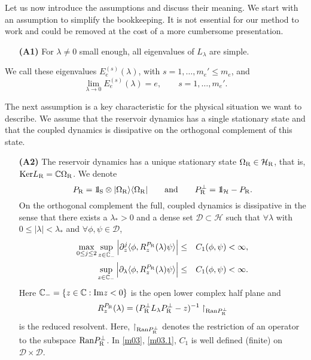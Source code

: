 \documentclass[letterpaper,onecolumn,11pt,accepted=2021-12-09]{quantumarticle}
\numberwithin{equation}{section}
\renewcommand{\r}{{\rm R}}
\newcommand{\s}{{\rm S}}
\newcommand{\bbbone}{\mathchoice {\rm 1\mskip-4mu l} {\rm 1\mskip-4mu l}
	{\rm 1\mskip-4.5mu l} {\rm 1\mskip-5mu l}}
\begin{document}
Let us now introduce the assumptions and discuss their meaning. We start with an assumption to simplify the  bookkeeping. It is not essential for our method to work and could be removed at the cost of a more cumbersome presentation.
\begin{itemize}
\item[{\bf (A1)}] For $\lambda\neq 0$ small enough, all eigenvalues of $L_\lambda$ are simple.
\end{itemize}
We call these eigenvalues $E^{(s)}_e(\lambda)$, with  $s=1,\ldots,m_e'\le m_e$, and 
\begin{equation}
\lim_{\lambda\rightarrow 0}E_e^{(s)}(\lambda)=e,\qquad s=1,\ldots,m_e'.
\label{0m2}
\end{equation}

The next assumption is a key characteristic for the physical situation we want to describe. We assume  that the reservoir dynamics has a single stationary state and that the coupled dynamics is dissipative on the orthogonal complement of this state. 
\begin{itemize}
\item[{\bf (A2)}] The reservoir dynamics has a unique stationary state $\Omega_\r\in{\mathcal H}_\r$, that is, ${\rm Ker} L_\r={\mathbb C}\Omega_\r$. We denote 
\begin{equation}
\label{POmega}
P_\r=\bbbone_\s\otimes|\Omega_\r\rangle\langle\Omega_\r| \qquad \mbox{and} \qquad P^\perp_\r=\bbbone_{\mathcal H}- P_\r.
\end{equation}
On the orthogonal complement the full, coupled dynamics is dissipative in the sense that there exists a $\lambda_*>0$ and a dense set ${\mathcal D}\subset{\mathcal H}$ such that $\forall \lambda$ with $0\leq |\lambda|<\lambda_*$ and $\forall \phi,\psi\in{\mathcal D}$, 
\begin{eqnarray}
	\max_{0\le j\le 2}\sup_{z\in{\mathbb C}_-}\Big| \partial_z^j \langle\phi, R_z^{P_\r}(\lambda) \psi\rangle\Big| &\le& C_1(\phi,\psi)<\infty,
	\label{m03}\\
	\sup_{z\in{\mathbb C}_-}\Big| \partial_\lambda\langle\phi, R_z^{P_\r}(\lambda) \psi\rangle\Big| &\le& C_1(\phi,\psi)<\infty.
	\label{m03.1}
\end{eqnarray}
Here ${\mathbb C}_- =\{ z\in {\mathbb C} : {\rm Im} z<0\}$ is the open lower complex half plane and 
$$
R_z^{P_\r}(\lambda) = (P^\perp_\r L_\lambda P^\perp_\r-z)^{-1}\upharpoonright_{{\rm Ran}P^\perp_\r}
$$  
is the reduced resolvent. Here, $\upharpoonright_{{\rm Ran}P^\perp_\r}$ denotes the restriction of an operator to the subspace ${\rm Ran}P^\perp_\r$.  In \eqref{m03}, \eqref{m03.1},
 $C_1$ is well defined (finite) on ${\mathcal D}\times{\mathcal D}$.
\end{itemize}
\end{document}
